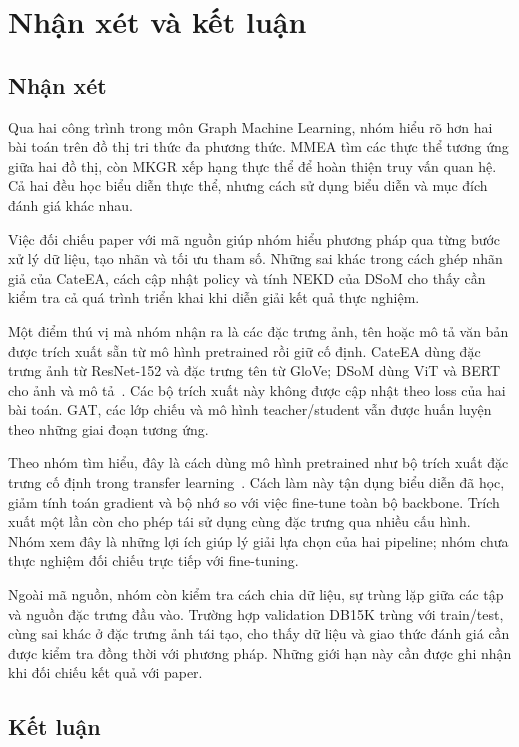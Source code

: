 \section{Nhận xét và kết luận}

\subsection{Nhận xét}

Qua hai công trình trong môn Graph Machine Learning, nhóm
hiểu rõ hơn hai bài toán trên đồ thị tri thức đa phương thức.
MMEA tìm các thực thể tương ứng giữa hai đồ thị, còn MKGR
xếp hạng thực thể để hoàn thiện truy vấn quan hệ. Cả hai đều
học biểu diễn thực thể, nhưng cách sử dụng biểu diễn và mục
đích đánh giá khác nhau.

Việc đối chiếu paper với mã nguồn giúp nhóm hiểu phương pháp
qua từng bước xử lý dữ liệu, tạo nhãn và tối ưu tham số.
Những sai khác trong cách ghép nhãn giả của CateEA, cách cập
nhật policy và tính NEKD của DSoM cho thấy cần kiểm tra cả
quá trình triển khai khi diễn giải kết quả thực nghiệm.

Một điểm thú vị mà nhóm nhận ra là các đặc trưng ảnh, tên
hoặc mô tả văn bản được trích xuất sẵn từ mô hình pretrained
rồi giữ cố định. CateEA dùng đặc trưng ảnh từ ResNet-152 và
đặc trưng tên từ GloVe; DSoM dùng ViT và BERT cho ảnh và mô
tả~\cite{feng-etal-2025-cateea,10.1145/3746027.3754576}.
Các bộ trích xuất này không được cập nhật theo loss của hai
bài toán. GAT, các lớp chiếu và mô hình teacher/student vẫn
được huấn luyện theo những giai đoạn tương ứng.

Theo nhóm tìm hiểu, đây là cách dùng mô hình pretrained như
bộ trích xuất đặc trưng cố định trong transfer
learning~\cite{pytorch_transfer_learning}. Cách làm này tận
dụng biểu diễn đã học, giảm tính toán gradient và bộ nhớ so
với việc fine-tune toàn bộ backbone. Trích xuất một lần còn
cho phép tái sử dụng cùng đặc trưng qua nhiều cấu hình.
Nhóm xem đây là những lợi ích giúp lý giải lựa chọn của hai
pipeline; nhóm chưa thực nghiệm đối chiếu trực tiếp với
fine-tuning.

Ngoài mã nguồn, nhóm còn kiểm tra cách chia dữ liệu, sự
trùng lặp giữa các tập và nguồn đặc trưng đầu vào. Trường hợp
validation DB15K trùng với train/test, cùng sai khác ở đặc
trưng ảnh tái tạo, cho thấy dữ liệu và giao thức đánh giá cần
được kiểm tra đồng thời với phương pháp. Những giới hạn này
cần được ghi nhận khi đối chiếu kết quả với paper.

\subsection{Kết luận}

